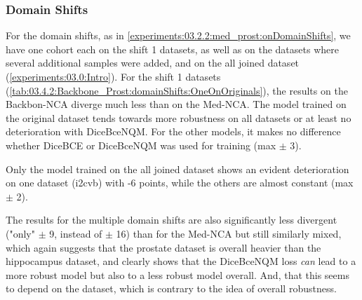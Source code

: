 \subsubsection{Domain Shifts}
\label{experiments:03.4.2:Backbone_prost:DomainShifts}
For the domain shifts, as in \autoref{experiments:03.2.2:med_prost:onDomainShifts}, we have one cohort each on the shift 1 datasets, as well as on the datasets where several additional samples were added, and on the all joined dataset (\autoref{experiments:03.0:Intro}). 
For the shift 1 datasets (\autoref{tab:03.4.2:Backbone_Prost:domainShifts:OneOnOriginals}), the results on the Backbon-NCA diverge much less than on the Med-NCA. The model trained on the original dataset tends towards more robustness on all datasets or at least no deterioration with DiceBceNQM. For the other models, it makes no difference whether DiceBCE or DiceBceNQM was used for training (max $\pm$ 3). 

Only the model trained on the all joined dataset shows an evident deterioration on one dataset (i2cvb) with -6 points, while the others are almost constant (max $\pm$ 2).

The results for the multiple domain shifts are also significantly less divergent ("only" $\pm$ 9, instead of $\pm$ 16) than for the Med-NCA but still similarly mixed, which again suggests that the prostate dataset is overall heavier than the hippocampus dataset, and clearly shows that the DiceBceNQM loss \textit{can} lead to a more robust model but also to a less robust model overall. And, that this seems to depend on the dataset, which is contrary to the idea of overall robustness.
\iffalse
XXX Singles ??? XXX 
-------------------
XXXX
--- Singels on Originals
mean: -0.0008
mean on absoulte values: 0.0164
sum: -0.019
sum on absoulte values: 0.411
range: (0.062, 0.059)


--- Singels on Singels
mean: -0.0027
mean on absoulte values: 0.0108
sum: -0.054
sum on absoulte values: 0.216
range: (-0.017, 0.024)

-------------------
XXXX
--- Multi on Originals
mean: 0.0038
mean on absoulte values: 0.0281
sum: 0.076
sum on absoulte values: 0.562
range: (-0.07, 0.087)

--- Multi on Multi
mean: 0.0081
mean on absoulte values: 0.0193
sum: 0.13
sum on absoulte values: 0.308
range: (-0.027, 0.066)
\fi
\iftable




\fi